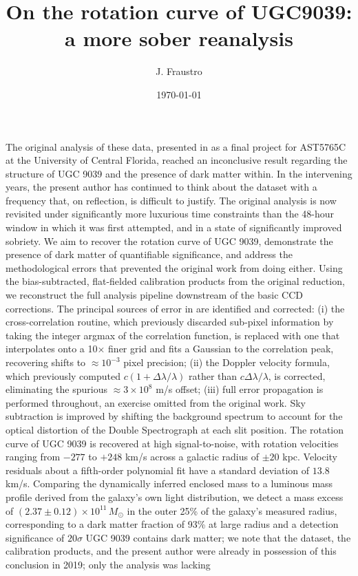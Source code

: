 \documentclass{aa}
\begin{document}
\title{On the rotation curve of UGC9039: a more sober reanalysis}

   \author{J. Fraustro}

   

   \date{\today}

  \abstract
   {The original analysis of these data, presented in \citet{fraustro} as a final project for AST5765C at the University of Central Florida, reached an inconclusive result regarding the structure of UGC 9039 and the presence of dark matter within. In the intervening years, the present author has continued to think about the dataset with a frequency that, on reflection, is difficult to justify. The original analysis is now revisited under significantly more luxurious time constraints than the 48-hour window in which it was first attempted, and in a state of significantly improved sobriety.}
   {We aim to recover the rotation curve of UGC 9039, demonstrate the presence of dark matter of quantifiable significance, and address the methodological errors that prevented the original work from doing either.} 
   {Using the bias-subtracted, flat-fielded calibration products from the original reduction, we reconstruct the full analysis pipeline downstream of the basic CCD corrections. The principal sources of error in \citet{fraustro} are identified and corrected: (i) the cross-correlation routine, which previously discarded sub-pixel information by taking the integer argmax of the correlation function, is replaced with one that interpolates onto a 10× finer grid and fits a Gaussian to the correlation peak, recovering shifts to $\approx 10^{-3}$ pixel precision; (ii) the Doppler velocity formula, which previously computed $c(1 + \Delta\lambda/\lambda)$ rather than $c\Delta\lambda/\lambda$, is corrected, eliminating the spurious $\approx3×10^{8}$ m/s offset; (iii) full error propagation is performed throughout, an exercise omitted from the original work. Sky subtraction is improved by shifting the background spectrum to account for the optical distortion of the Double Spectrograph at each slit position.}
   {The rotation curve of UGC 9039 is recovered at high signal-to-noise, with rotation velocities ranging from $-277$ to $+248$ km/s across a galactic radius of $\pm20$ kpc. Velocity residuals about a fifth-order polynomial fit have a standard deviation of $13.8$ km/s. Comparing the dynamically inferred enclosed mass to a luminous mass profile derived from the galaxy's own light distribution, we detect a mass excess of $(2.37\pm0.12)\times10^{11}\,M_{\odot}$ in the outer 25\% of the galaxy's measured radius, corresponding to a dark matter fraction of 93\% at large radius and a detection significance of $20\sigma$}
   {UGC 9039 contains dark matter; we note that the dataset, the calibration products, and the present author were already in possession of this conclusion in 2019; only the analysis was lacking}
\end{document}
